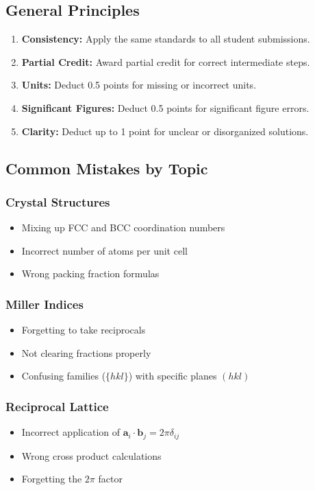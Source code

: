 \documentclass[12pt,a4paper]{article}
\begin{document}
\subsection{General Principles}
\begin{enumerate}
    \item \textbf{Consistency:} Apply the same standards to all student submissions.
    \item \textbf{Partial Credit:} Award partial credit for correct intermediate steps.
    \item \textbf{Units:} Deduct 0.5 points for missing or incorrect units.
    \item \textbf{Significant Figures:} Deduct 0.5 points for significant figure errors.
    \item \textbf{Clarity:} Deduct up to 1 point for unclear or disorganized solutions.
\end{enumerate}

\subsection{Common Mistakes by Topic}

\subsubsection{Crystal Structures}
\begin{itemize}
    \item Mixing up FCC and BCC coordination numbers
    \item Incorrect number of atoms per unit cell
    \item Wrong packing fraction formulas
\end{itemize}

\subsubsection{Miller Indices}
\begin{itemize}
    \item Forgetting to take reciprocals
    \item Not clearing fractions properly
    \item Confusing families ($\{hkl\}$) with specific planes $(hkl)$
\end{itemize}

\subsubsection{Reciprocal Lattice}
\begin{itemize}
    \item Incorrect application of $\mathbf{a}_i \cdot \mathbf{b}_j = 2\pi\delta_{ij}$
    \item Wrong cross product calculations
    \item Forgetting the $2\pi$ factor
\end{itemize}
\end{document}
